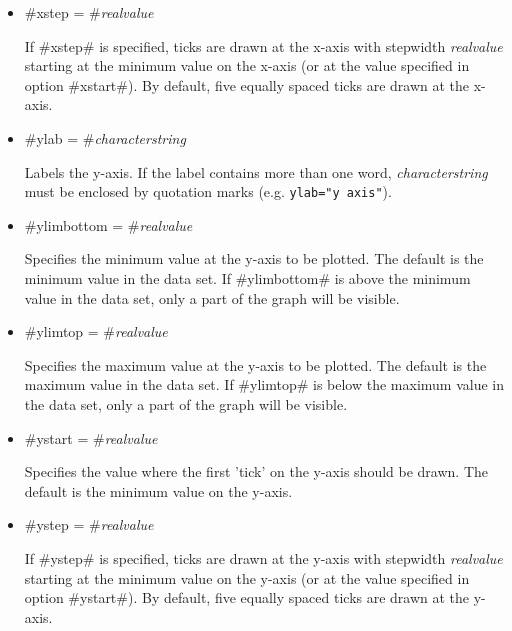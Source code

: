 \begin{itemize}
\item #xstep = #{\em realvalue}

If #xstep# is specified,  ticks are drawn at the x-axis with
stepwidth {\em realvalue} starting at the minimum value on the
x-axis (or at the value specified in option #xstart#). By default,
five equally spaced ticks are drawn at the x-axis.

\item #ylab = #{\em characterstring}

Labels the y-axis. If the label contains more than one word, {\em
characterstring} must be enclosed by quotation marks (e.g.
\texttt{ylab="y axis"}).

\item #ylimbottom = #{\em realvalue}

Specifies the minimum value at the y-axis to be plotted. The
default is the minimum value in the data set. If #ylimbottom# is
above the minimum value in the data set, only a part of the graph
will be visible.

\item #ylimtop = #{\em realvalue}

Specifies the maximum value at the y-axis to be plotted. The
default is the maximum value in the data set. If #ylimtop# is
below the maximum value in the data set, only a part of the graph
will be visible.

\item #ystart = #{\em realvalue}

Specifies the value where the first 'tick' on the y-axis should be
drawn. The default is the minimum value on the y-axis.

\item #ystep = #{\em realvalue}

If #ystep# is specified,  ticks are drawn at the y-axis with
stepwidth {\em realvalue} starting at the minimum value on the
y-axis (or at the value specified in option #ystart#). By default,
five equally spaced ticks are drawn at the y-axis.
\end{itemize}

\newpage

